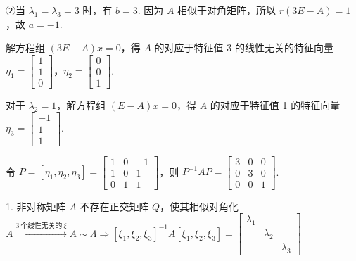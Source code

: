 ②当 $\lambda_1=\lambda_3=3$ 时，有 $b=3$. 因为 $A$ 相似于对角矩阵，所以 $r(3E-A)=1$，故 $a=-1$.

解方程组 $(3E-A)x=0$，得 $A$ 的对应于特征值 3 的线性无关的特征向量 $\eta_1=\begin{bmatrix}1\\1\\0\end{bmatrix}$，$\eta_2=\begin{bmatrix}0\\0\\1\end{bmatrix}$.

对于 $\lambda_2=1$，解方程组 $(E-A)x=0$，得 $A$ 的对应于特征值 1 的特征向量 $\eta_3=\begin{bmatrix}-1\\1\\1\end{bmatrix}$.

令 $P=[\eta_1,\eta_2,\eta_3]=\begin{bmatrix}1&0&-1\\1&0&1\\0&1&1\end{bmatrix}$，则 $P^{-1}AP=\begin{bmatrix}3&0&0\\0&3&0\\0&0&1\end{bmatrix}$.




\begin{fcard}{1. 非对称矩阵 $A$ 不存在正交矩阵 $Q$，使其相似对角化}
$A\xrightarrow{3\ \text{个线性无关的}\ \xi}A\sim\Lambda\Rightarrow[\xi_1,\xi_2,\xi_3]^{-1}A[\xi_1,\xi_2,\xi_3]=\begin{bmatrix}\lambda_1&&\\&\lambda_2&\\&&\lambda_3\end{bmatrix}$
\end{fcard}

